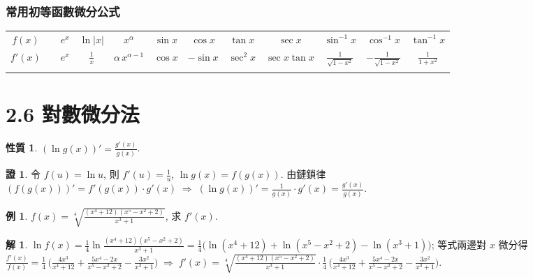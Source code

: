 \documentclass[12pt]{extarticle}
\newcommand{\ds}{\displaystyle}
\newcommand{\ie}{\;\Longrightarrow\;}
\theoremstyle{definition}
\newtheorem*{prp}{性質}
\newtheorem*{ex}{例}
\newtheorem*{sol}{解}
\newtheorem*{prf}{證}
\begin{document}
\subsubsection*{常用初等函數微分公式}

\begin{table}[!htbp]
  \centering
  \begin{tabular}{c|ccccccccccc}
    \toprule
    \addlinespace[2mm]
    $\ds f(x)$ & & $\ds e^x$ & $\ds\ln |x|$ & $\ds x^\alpha$ & $\ds\sin x$ & $\ds\cos x$ & $\ds\tan x$ & $\ds\sec x$ & $\ds\sin^{-1}\!x$ & $\ds\cos^{-1}\!x$ & $\ds\tan^{-1}\!x$ \\
    \addlinespace[2mm]
    \midrule
    \addlinespace[2mm]
    $\ds f'(x)$ & & $\ds e^x$ & $\ds\frac{1}{x}$ & $\ds \alpha\,x^{\alpha - 1}$ & $\ds\cos x$ & $\ds-\sin x$ & $\ds\sec^2\!x$ & $\ds\sec x\tan x$ & $\ds\frac{1}{\sqrt{1 - x^2}}$ & $\ds -\frac{1}{\sqrt{1 - x^2}}$ & $\ds\frac{1}{1 + x^2}$ \\
    \addlinespace[2mm]
    \bottomrule
  \end{tabular}
\end{table}

\section*{2.6 對數微分法}

\begin{prp}
  $\ds(\ln g(x))' = \frac{g'(x)}{g(x)}$.  
\end{prp}

\begin{prf}
  令 $\ds f(u) = \ln u$, 則 $\ds f'(u) = \frac{1}{u}$, $\ds\ln g(x) = f(g(x))$. 由鏈鎖律 $\ds(f(g(x)))' = f'(g(x))\cdot g'(x) \ie (\ln g(x))' = \frac{1}{g(x)}\cdot g'(x) = \frac{g'(x)}{g(x)}$. 
\end{prf}

\begin{ex}
  $\ds f(x) = \sqrt[4]{\frac{(x^4 + 12)(x^5 - x^2 + 2)}{x^3 + 1}}$, 求 $f'(x)$. 
\end{ex}

\begin{sol}
  $\ds\ln f(x) = \frac{1}{4}\ln\frac{(x^4 + 12)(x^5 - x^2 + 2)}{x^3 + 1} = \frac{1}{4}\big(\ln(x^4 + 12) + \ln(x^5 - x^2 + 2) - \ln(x^3 + 1)\big)$; 等式兩邊對 $x$ 微分得 $\ds\frac{f'(x)}{f(x)} = \frac{1}{4}\,\Big(\frac{4x^3}{x^4 + 12} + \frac{5x^4 - 2x}{x^5 - x^2 + 2} - \frac{3x^2}{x^3 + 1}\Big) \ie f'(x) = \sqrt[4]{\frac{(x^4 + 12)(x^5 - x^2 + 2)}{x^3 + 1}}\cdot\frac{1}{4}\,\Big(\frac{4x^3}{x^4 + 12} + \frac{5x^4 - 2x}{x^5 - x^2 + 2} - \frac{3x^2}{x^3 + 1}\Big)$. 
\end{sol}
\end{document}
